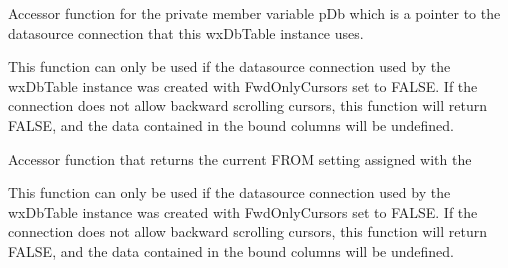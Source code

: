 


\label{wxdbtablegetcoldefs}




\label{wxdbtablegetcursor}




\label{wxdbtablegetdb}


Accessor function for the private member variable pDb which is a pointer to the datasource connection that this wxDbTable instance uses.



\label{wxdbtablegetfirst}



This function can only be used if the datasource connection used by the wxDbTable instance was created with FwdOnlyCursors set to FALSE.  If the connection does not allow backward scrolling cursors, this function will return FALSE, and the data contained in the bound columns will be undefined.




\label{wxdbtablegetfromclause}


Accessor function that returns the current FROM setting assigned with the 


\label{wxdbtablegetlast}


This function can only be used if the datasource connection used by the wxDbTable instance was created with FwdOnlyCursors set to FALSE.  If the connection does not allow backward scrolling cursors, this function will return FALSE, and the data contained in the bound columns will be undefined.

